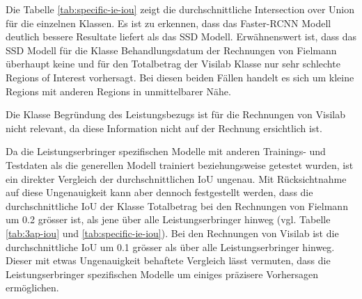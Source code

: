 Die Tabelle \ref{tab:specific-ie-iou} zeigt die durchschnittliche Intersection over Union für die einzelnen Klassen. Es ist zu erkennen, dass das Faster-RCNN Modell deutlich bessere Resultate liefert als das SSD Modell. Erwähnenswert ist, dass das SSD Modell für die Klasse Behandlungsdatum der Rechnungen von Fielmann überhaupt keine und für den Totalbetrag der Visilab Klasse nur sehr schlechte Regions of Interest vorhersagt. Bei diesen beiden Fällen handelt es sich um kleine Regions mit anderen Regions in unmittelbarer Nähe.

Die Klasse Begründung des Leistungsbezugs ist für die Rechnungen von Visilab nicht relevant, da diese Information nicht auf der Rechnung ersichtlich ist.

Da die Leistungserbringer spezifischen Modelle mit anderen Trainings- und Testdaten als die generellen Modell trainiert beziehungsweise getestet wurden, ist ein direkter Vergleich der durchschnittlichen IoU ungenau. Mit Rücksichtnahme auf diese Ungenauigkeit kann aber dennoch festgestellt werden, dass die durchschnittliche IoU der Klasse Totalbetrag bei den Rechnungen von Fielmann um 0.2 grösser ist, als jene über alle Leistungserbringer hinweg (vgl. Tabelle \ref{tab:3ap-iou} und \ref{tab:specific-ie-iou}). Bei den Rechnungen von Visilab ist die durchschnittliche IoU um 0.1 grösser als über alle Leistungserbringer hinweg. Dieser mit etwas Ungenauigkeit behaftete Vergleich lässt vermuten, dass die Leistungserbringer spezifischen Modelle um einiges präzisere Vorhersagen ermöglichen.

